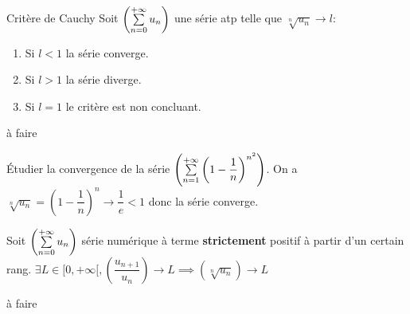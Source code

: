 \documentclass[a4paper, 12pt]{article}
\begin{document}
\begin{proposition}{Critère de Cauchy}{}
    Soit $\seriedef{u_n}{0}$ une série atp telle que $\sqrt[n]{u_n} \rightarrow l$:
    \begin{enumerate}
        \item Si $l \lt 1$ la série converge.
        \item Si $l \gt 1$ la série diverge.
        \item Si $l = 1$ le critère est non concluant.
    \end{enumerate}
\end{proposition}

\begin{demonstration}
    \begin{hotwarn}
        à faire
    \end{hotwarn}
\end{demonstration}

\begin{exemple}
    Étudier la convergence de la série $\seriedef{\left(1 - \dfrac{1}{n}\right)^{n^2}}{1}$.
    On a $\sqrt[n]{u_n} = \left(1 - \dfrac{1}{n}\right)^n \rightarrow \dfrac{1}{e} \lt 1$
    donc la série converge.
\end{exemple}

\begin{proposition}{}{}
    Soit $\seriedef{u_n}{0}$ série numérique à terme \textbf{strictement} positif à partir d'un certain rang.\n
    $\exists L \in [0, +\infty[, \left( \dfrac{u_{n+1}}{u_n} \right) \rightarrow L \implies \left( \sqrt[n]{u_n} \right) \rightarrow L$
\end{proposition}

\begin{demonstration}
    \begin{hotwarn}
        à faire
    \end{hotwarn}
\end{demonstration}
\end{document}
